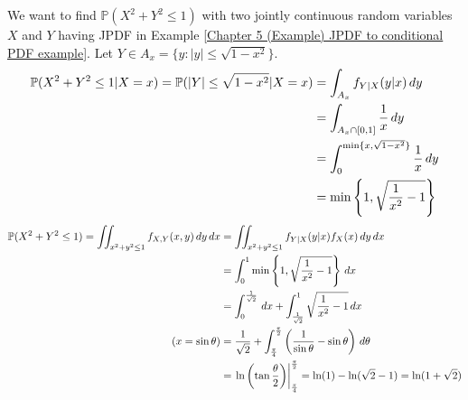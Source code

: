 \documentclass{huhtakm-template-book}
\newcommand{\prob}{\mathbb{P}}
\begin{document}
\begin{eg}
	We want to find $\prob(X^{2}+Y^{2}\leq 1)$ with two jointly continuous random variables $X$ and $Y$ having JPDF in Example \ref{Chapter 5 (Example) JPDF to conditional PDF example}. Let $Y\in A_{x}=\{y:|y|\leq\sqrt{1-x^{2}}\}$.
	\begin{align*}
		\prob(X^{2}+Y^{2}\leq 1|X=x)=\prob(|Y|\leq\sqrt{1-x^{2}}|X=x)&=\int_{A_{x}}f_{Y|X}(y|x)\,dy\\
		&=\int_{A_{x}\cap[0,1]}\frac{1}{x}\,dy\\
		&=\intlu{0}{\min\{x,\sqrt{1-x^{2}}\}}\frac{1}{x}\,dy\\
		&=\min\left\{1,\sqrt{\frac{1}{x^{2}}-1}\right\}
	\end{align*}
	\begin{align*}
		\prob(X^{2}+Y^{2}\leq 1)=\iint_{x^{2}+y^{2}\leq 1}f_{X,Y}(x,y)\,dy\,dx&=\iint_{x^{2}+y^{2}\leq 1}f_{Y|X}(y|x)f_{X}(x)\,dy\,dx\\
		&=\intlu{0}{1}\min\left\{1,\sqrt{\frac{1}{x^{2}}-1}\right\}\,dx\\
		&=\intlu{0}{\frac{1}{\sqrt{2}}}\,dx+\intlu{\frac{1}{\sqrt{2}}}{1}\sqrt{\frac{1}{x^{2}}-1}\,dx\\
		\tag{$x=\sin\theta$}
		&=\frac{1}{\sqrt{2}}+\intlu{\frac{\pi}{4}}{\frac{\pi}{2}}\left(\frac{1}{\sin\theta}-\sin\theta\right)\,d\theta\\
		&=\left.\ln\left(\tan\frac{\theta}{2}\right)\right|_{\frac{\pi}{4}}^{\frac{\pi}{2}}=\ln(1)-\ln(\sqrt{2}-1)=\ln(1+\sqrt{2})
	\end{align*}
\end{eg}
\end{document}
